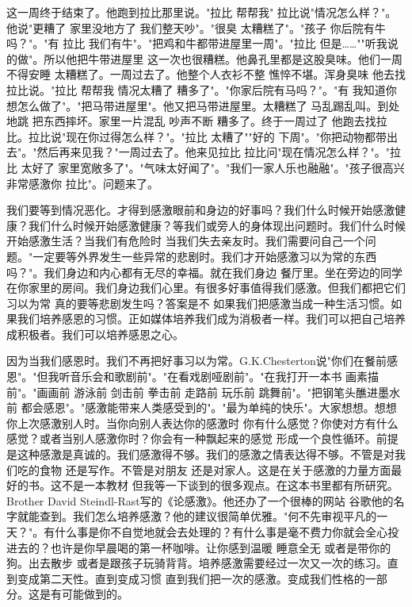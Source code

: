 这一周终于结束了。他跑到拉比那里说。"拉比 帮帮我" 拉比说"情况怎么样？"。他说"更糟了 家里没地方了 我们整天吵"。"很臭 太糟糕了"。"孩子 你后院有牛吗？"。"有 拉比 我们有牛"。"把鸡和牛都带进屋里一周"。"拉比 但是……""听我说的做"。所以他把牛带进屋里 这一次也很糟糕。他鼻孔里都是这股臭味。他们一周不得安睡 太糟糕了。一周过去了。他整个人衣衫不整 憔悴不堪。浑身臭味 他去找拉比说。"拉比 帮帮我 情况太糟了 糟多了"。"你家后院有马吗？"。"有 我知道你想怎么做了"。"把马带进屋里"。他又把马带进屋里。太糟糕了 马乱踢乱叫。到处地跳 把东西摔坏。家里一片混乱 吵声不断 糟多了。终于一周过了 他跑去找拉比。拉比说"现在你过得怎么样？"。"拉比 太糟了""好的 下周"。"你把动物都带出去"。"然后再来见我？"一周过去了。他来见拉比 拉比问"现在情况怎么样？"。"拉比 太好了 家里宽敞多了"。"气味太好闻了"。"我们一家人乐也融融"。"孩子很高兴 非常感激你 拉比"。问题来了。 

我们要等到情况恶化。才得到感激眼前和身边的好事吗？我们什么时候开始感激健康？我们什么时候开始感激健康？等我们或旁人的身体现出问题时。我们什么时候开始感激生活？当我们有危险时 当我们失去亲友时。我们需要问自己一个问题。"一定要等外界发生一些异常的悲剧时。我们才开始感激习以为常的东西吗？"。我们身边和内心都有无尽的幸福。就在我们身边 餐厅里。坐在旁边的同学 在你家里的房间。我们身边我们心里。有很多好事值得我们感激。但我们都把它们习以为常 真的要等悲剧发生吗？答案是不 如果我们把感激当成一种生活习惯。如果我们培养感恩的习惯。正如媒体培养我们成为消极者一样。我们可以把自己培养成积极者。我们可以培养感恩之心。 

因为当我们感恩时。我们不再把好事习以为常。G.K.Chesterton说"你们在餐前感恩"。"但我听音乐会和歌剧前"。"在看戏剧哑剧前"。"在我打开一本书 画素描前"。"画画前 游泳前 剑击前 拳击前 走路前 玩乐前 跳舞前"。"把钢笔头醮进墨水前 都会感恩"。"感激能带来人类感受到的"。"最为单纯的快乐"。大家想想。想想你上次感激别人时。当你向别人表达你的感激时 你有什么感觉？你使对方有什么感觉？或者当别人感激你时？你会有一种飘起来的感觉 形成一个良性循环。前提是这种感激是真诚的。我们感激得不够。我们的感激之情表达得不够。不管是对我们吃的食物 还是写作。不管是对朋友 还是对家人。这是在关于感激的力量方面最好的书。这不是一本教材 但我等一下谈到的很多观点。在这本书里都有所研究。Brother David Steindl-Rast写的《论感激》。他还办了一个很棒的网站 谷歌他的名字就能查到。我们怎么培养感激？他的建议很简单优雅。"何不先审视平凡的一天？"。有什么事是你不自觉地就会去处理的？有什么事是毫不费力你就会全心投进去的？也许是你早晨喝的第一杯咖啡。让你感到温暖 睡意全无 或者是带你的狗。出去散步 或者是跟孩子玩骑背背。培养感激需要经过一次又一次的练习。直到变成第二天性。直到变成习惯 直到我们把一次的感激。变成我们性格的一部分。这是有可能做到的。 


